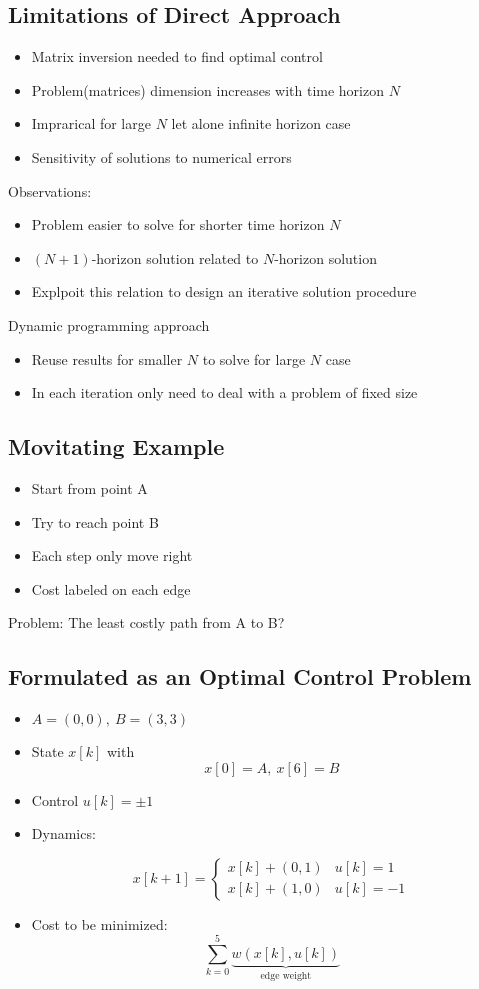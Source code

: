 \documentclass[10pt,a4paper,oneside]{article}
\begin{document}
\subsection{Limitations of Direct Approach}
\begin{itemize}
	\item Matrix inversion needed to find optimal control
	\item Problem(matrices) dimension increases with time horizon $N$
	\item Imprarical for large $N$ let alone infinite horizon case
	\item Sensitivity of solutions to numerical errors
	
\end{itemize}
Observations:
\begin{itemize}
	\item Problem easier to solve for shorter time horizon $N$
	\item $(N+1)$-horizon solution related to $N$-horizon solution
	\item Explpoit this relation to design an iterative solution procedure
\end{itemize}
Dynamic programming approach
\begin{itemize}
	\item Reuse results for smaller $N$ to solve for large $N$ case
	\item In each iteration only need to deal with a problem of fixed size
\end{itemize}
\subsection{Movitating Example}
\begin{itemize}
	\item Start from point A
	\item Try to reach point B
	\item Each step only move right
	\item Cost labeled on each edge
\end{itemize}
Problem: The least costly path from A to B?
\subsection{Formulated as an Optimal Control Problem}
\begin{itemize}
	\item $A=(0, 0),\ B=(3, 3)$
	\item State $x[k]$ with
	\[
	x[0]=A,\ x[6]=B
	\]
	\item Control $u[k]=\pm1$
	\item Dynamics:
	
	$$
	x[k+1]=\left\{\begin{array}{ll}{x[k]+(0,1)} & {u[k]=1} \\ {x[k]+(1,0)} & {u[k]=-1}\end{array}\right.
	$$
	\item Cost to be minimized:
	\[
	\sum_{k=0}^{5} \underbrace{w(x[k], u[k])}_{\text { edge weight }}
	\]
\end{itemize}
\end{document}
